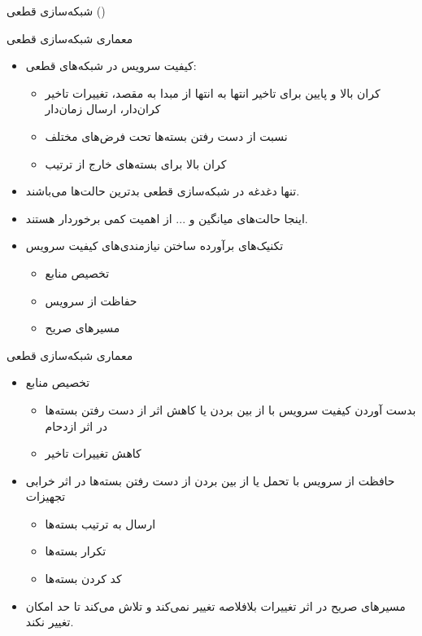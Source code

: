 \documentclass[dvipsnames]{beamer}
\makeatletter
\newcommand{\RTList}{\raggedleft\rightskip\@totalleftmargin}
\makeatother
\begin{document}
\begin{persian}
	\begin{frame}{شبکه‌سازی قطعی ()}
	  \begin{latin}
	  \end{latin}
	\end{frame}

	\begin{frame}{معماری شبکه‌سازی قطعی}
		\begin{itemize}\RTList{}
			\justifying%
			\item کیفیت سرویس در شبکه‌های قطعی:
			\begin{itemize}\RTList{}
			  \item کران بالا و پایین برای تاخیر انتها به انتها از مبدا به مقصد، تغییرات تاخیر کران‌دار، ارسال زمان‌دار
			  \item نسبت از دست رفتن بسته‌ها تحت فرض‌های مختلف
			  \item کران بالا برای بسته‌های خارج از ترتیب
			\end{itemize}
		  \item تنها دغدغه در شبکه‌سازی قطعی بدترین حالت‌ها می‌باشند.
		  \item اینجا حالت‌های میانگین و ... از اهمیت کمی برخوردار هستند.
		  \item تکنیک‌های برآورده ساختن نیازمندی‌های کیفیت سرویس
		  \begin{itemize}\RTList{}
			\item تخصیص منابع
			\item حفاظت از سرویس
			\item مسیرهای صریح
		  \end{itemize}
		\end{itemize}
	\end{frame}

	\begin{frame}{معماری شبکه‌سازی قطعی}
		\begin{itemize}\RTList{}
			\justifying%
			\item تخصیص منابع
			\begin{itemize}\RTList{}
			  \item بدست آوردن کیفیت سرویس با از بین بردن یا کاهش اثر از دست رفتن بسته‌ها در اثر ازدحام
			  \item کاهش تغییرات تاخیر
			\end{itemize}
		  \item حافظت از سرویس با تحمل یا از بین بردن از دست رفتن بسته‌ها در اثر خرابی تجهیزات
		  \begin{itemize}\RTList{}
			\item ارسال به ترتیب بسته‌ها
			\item تکرار بسته‌ها
			\item کد کردن بسته‌ها
		  \end{itemize}
		  \item مسیرهای صریح در اثر تغییرات بلافلاصه تغییر نمی‌کند و تلاش می‌کند تا حد امکان تغییر نکند.
		\end{itemize}
	\end{frame}


\end{persian}
\end{document}
